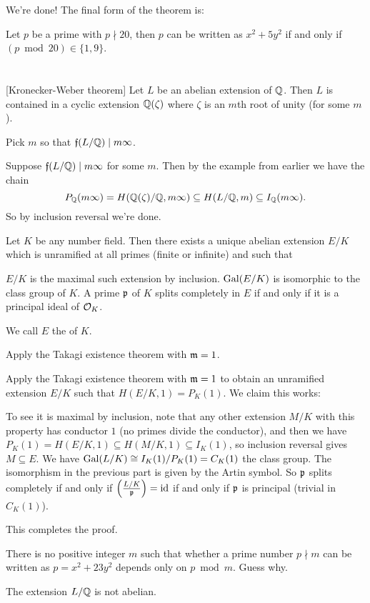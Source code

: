 We're done! The final form of the theorem is:
\begin{theorem}
	Let $p$ be a prime with $p \nmid 20$, then $p$ can be written as $x^2 + 5y^2$ if and only if
	$(p \bmod 20) \in \{ 1, 9 \}$.
\end{theorem}


\section{\problemhead}
\begin{dproblem}
	\label{prob:kronecker_weber_theorem}
	[Kronecker-Weber theorem]
	Let $L$ be an abelian extension of $\mathbb Q$.
	Then $L$ is contained in a cyclic extension $\mathbb Q(\zeta)$
	where $\zeta$ is an $m$th root of unity (for some $m$).
	\begin{hint}
		Pick $m$ so that $\mathfrak f(L/\mathbb Q) \mid m\infty$.
	\end{hint}
	\begin{sol}
		Suppose $\mathfrak f(L/\mathbb Q) \mid m\infty$ for some $m$.
		Then by the example from earlier we have the chain
		\[ P_{\mathbb Q}(m\infty) = H(\mathbb Q(\zeta)/\mathbb Q, m\infty)
			\subseteq H(L/\mathbb Q, m) \subseteq I_\mathbb Q(m\infty). \]
		So by inclusion reversal we're done.
	\end{sol}
\end{dproblem}

\begin{dproblem}
	\label{prob:hilbert_class_field}
	Let $K$ be any number field.
	Then there exists a unique abelian extension $E/K$
	which is unramified at all primes (finite or infinite)
	and such that
	\begin{itemize}
		\ii $E/K$ is the maximal such extension by inclusion.
		\ii $\operatorname{Gal}(E/K)$ is isomorphic to the class group of $K$.
		\ii A prime $\mathfrak p$ of $K$ splits completely in $E$
		if and only if it is a principal ideal of $\mathcal O_K$.
	\end{itemize}
	We call $E$ the  of $K$.
	\begin{hint}
		Apply the Takagi existence theorem with $\mathfrak m = 1$.
	\end{hint}
	\begin{sol}
		Apply the Takagi existence theorem with $\mathfrak m = 1$
		to obtain an unramified extension $E/K$ such that
		$H(E/K, 1) = P_K(1)$.
		We claim this works:
		\begin{itemize}
			\ii To see it is maximal by inclusion, note that any other extension $M/K$
			with this property has conductor $1$ (no primes divide the conductor),
			and then we have $P_K(1) = H(E/K, 1) \subseteq H(M/K, 1) \subseteq I_K(1)$,
			so inclusion reversal gives $M \subseteq E$.
			\ii We have $\operatorname{Gal}(L/K) \cong I_K(1) / P_K(1) = C_K(1)$ the class group.
			\ii The isomorphism in the previous part is given by the Artin symbol.
			So $\mathfrak p$ splits completely if and only if $\left( \frac{L/K}{\mathfrak p} \right) = \mathrm{id}$
			if and only if $\mathfrak p$ is principal (trivial in $C_K(1)$).
		\end{itemize}
		This completes the proof.
	\end{sol}
\end{dproblem}

\begin{problem}
	There is no positive integer $m$ such that whether a prime number $p \nmid m$ can be written as
	$p = x^2 + 23 y^2$ depends only on $p \bmod m$. Guess why.
	\begin{hint}
		The extension $L/\mathbb Q$ is not abelian.
	\end{hint}
\end{problem}
